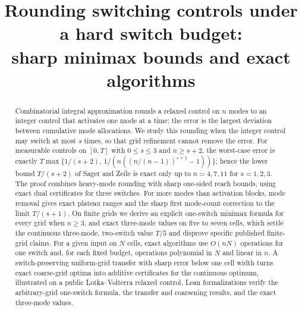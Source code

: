 \documentclass[11pt]{article}
\title{Rounding switching controls under a hard switch budget:\\sharp minimax bounds and exact algorithms}
\author{}
\date{}
\begin{document}
\maketitle
\begin{abstract}
Combinatorial integral approximation rounds a relaxed control on $n$ modes to
an integer control that activates one mode at a time; the error is the
largest deviation between cumulative mode allocations. We study this rounding
when the integer control may switch at most $s$ times, so that grid
refinement cannot remove the error. For measurable controls on $[0,T]$ with
$0\le s\le3$ and $n\ge s+2$, the worst-case error is exactly
$T\max\{1/(s+2),\,1/(n((n/(n-1))^{s+1}-1))\}$; hence the lower bound
$T/(s+2)$ of Sager and Zeile is exact only up to $n=4,7,11$ for $s=1,2,3$.
The proof combines heavy-mode rounding with sharp one-sided reach bounds,
using exact dual certificates for three switches. For more modes than
activation blocks, mode removal gives exact plateau ranges and the sharp
first mode-count correction to the limit $T/(s+1)$. On finite grids we
derive an explicit one-switch minimax formula for every grid when $n\ge3$,
and exact three-mode values on five to seven cells, which settle the
continuous three-mode, two-switch value $T/5$ and disprove specific published
finite-grid claims. For a given input on $N$ cells, exact algorithms use
$O(nN)$ operations for one switch and, for each fixed budget, operations
polynomial in $N$ and linear in $n$. A switch-preserving uniform-grid
transfer with sharp error below one cell width turns exact coarse-grid optima
into additive certificates for the continuous optimum, illustrated on a
public Lotka--Volterra relaxed control. Lean formalizations verify the
arbitrary-grid one-switch formula, the transfer and coarsening results, and
the exact three-mode values.
\end{abstract}














\appendix



\end{document}
